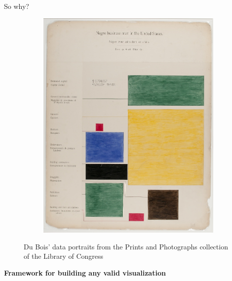 \documentclass[xcolor={dvipsnames}, handout]{beamer}
\begin{document}
\begin{frame}{So why?}
\begin{figure}[H]
\begin{subfigure}{.24\textwidth}
            \includegraphics[width=1\textwidth]{figures/intro/du_bois_heat.png}
            \caption{}
            \label{fig:intro_dbd}
        \end{subfigure}
        \caption{Du Bois' data portraits from the Prints and Photographs collection of the Library of Congress \cite{duboisGeorgiaNegroCity1900,duboisGeorgiaNegroValuation1900, duboisSeriesStatisticalCharts, duboisSeriesStatisticalChartsa}}
        \label{fig:intro_dubois}
    \end{figure}
    \begin{center}
        \textbf{Framework for building any valid visualization}
    \end{center}
\end{frame}
\end{document}
